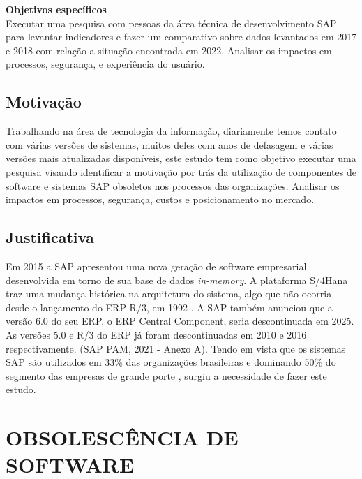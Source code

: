 \textbf{Objetivos específicos}\\
Executar uma pesquisa com pessoas da área técnica de desenvolvimento SAP para levantar indicadores e fazer um comparativo sobre dados levantados em 2017 e 2018 com relação a situação encontrada em 2022.
Analisar os impactos em processos, segurança, e experiência do usuário.

\subsection{\esp Motivação}
Trabalhando na área de tecnologia da informação, diariamente temos contato com várias versões de sistemas, muitos deles com anos de defasagem e várias versões mais atualizadas disponíveis, este estudo tem como objetivo executar uma pesquisa visando identificar a motivação por trás da utilização de componentes de software e sistemas SAP obsoletos nos processos das organizações. Analisar os impactos em processos, segurança, custos e posicionamento no mercado.

\subsection{\esp Justificativa}
Em 2015 a SAP apresentou uma nova geração de software empresarial desenvolvida em torno de sua base de dados \textit{in-memory}. A plataforma S/4Hana traz uma mudança histórica na arquitetura do sistema, algo que não ocorria desde o lançamento do ERP R/3, em 1992 \cite{computerworld}. A SAP também anunciou que a versão 6.0 do seu ERP, o ERP Central Component, seria descontinuada em 2025. As versões 5.0 e R/3 do ERP já foram descontinuadas em 2010 e 2016 respectivamente. (SAP PAM, 2021 - Anexo A).
Tendo em vista que os sistemas SAP são utilizados em 33\% das organizações brasileiras e dominando 50\% do segmento das empresas de grande porte \cite{fgv}, surgiu a necessidade de fazer este estudo.


\section{\esp OBSOLESCÊNCIA DE SOFTWARE}

